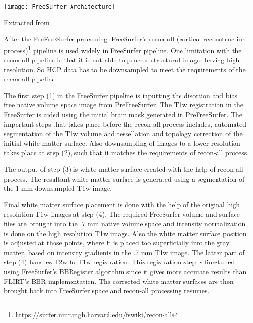 \begin{center}
  \texttt{[image: FreeSurfer\_Architecture]}
  \label{fig:freesurfer_overview}
  \caption*{Extracted from \cite{Gla13}}
\end{center}

After the PreFreeSurfer processing, FreeSurfer's recon-all (cortical reconstruction process)\footnote{\url{https://surfer.nmr.mgh.harvard.edu/fswiki/recon-all}} pipeline is used widely in FreeSurfer pipeline. One limitation with the recon-all pipeline is that it is not able to process structural images having high resolution. So HCP data has to be downsampled to meet the requirements of the recon-all pipeline.

The first step (1) in the FreeSurfer pipeline is inputting the disortion and bias free native volume space image from PreFreeSurfer. The T1w registration in the FreeSurfer is aided using the initial brain mask generated in PreFreeSurfer. The important steps that takes place before the recon-all process includes, automated segmentation of the T1w volume and tessellation and topology correction of the initial white matter surface. Also downsampling of images to a lower resolution takes place at step (2), such that it matches the requirements of recon-all process.

The output of step (3) is white-matter surface created with the help of recon-all process. The resultant white matter surface is generated using a segmentation of the 1 mm downsampled T1w image.

Final white matter surface placement is done with the help of the original high resolution T1w images at step (4). The required FreeSurfer volume and surface files are brought into the .7 mm native volume space and intensity normalization is done on the high resolution T1w image. Also the white matter surface position is adjusted at those points, where it is placed too superficially into the gray matter, based on intensity gradients in the .7 mm T1w image. The latter part of step (4) handles T2w to T1w registration. This registration step is fine-tuned using FreeSurfer's BBRegister algorithm since it gives more accurate results than FLIRT's BBR implementation. The corrected white matter surfaces are then brought back into FreeSurfer space and recon-all processing resumes.

